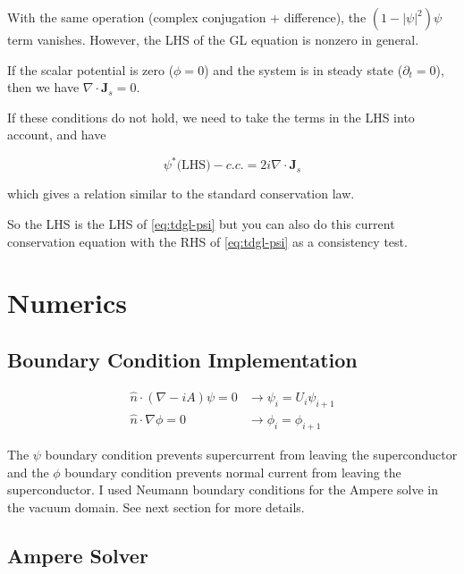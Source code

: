 \documentclass[11pt]{article}
\theoremstyle{definition}
\begin{document}
With the same operation (complex conjugation + difference), the $(1-|\psi|^2)\psi$ term vanishes. However, the LHS of the GL equation is nonzero in general.

If the scalar potential is zero ($\phi=0$) and the system is in steady state ($\partial_t = 0$), then we have $\nabla\cdot\mathbf{J}_s=0$.

If these conditions do not hold, we need to take the terms in the LHS into account, and have

\begin{equation}
\label{eq:cc-final}
\psi^* \text{(LHS)} - c.c. = 2i \nabla\cdot\mathbf{J}_s
\end{equation}

which gives a relation similar to the standard conservation law.

So the LHS is the LHS of \cref{eq:tdgl-psi} but you can also do this current conservation equation with the RHS of \cref{eq:tdgl-psi} as a consistency test.


\section{Numerics}
\label{sec:numerics}

\subsection{Boundary Condition Implementation}
\label{sec:bc-impl}

\begin{align}
\hat{n} \cdot (\nabla - i A) \psi = 0 &\rightarrow \psi_i = U_i \psi_{i+1} \label{eq:bc-impl-super}\\
\hat{n} \cdot \nabla \phi = 0 &\rightarrow \phi_i = \phi_{i+1} \label{eq:bc-impl-normal}
\end{align}

The $\psi$ boundary condition prevents supercurrent from leaving the superconductor and the $\phi$ boundary condition prevents normal current from leaving the superconductor.
I used Neumann boundary conditions for the Ampere solve in the vacuum domain. See next section for more details.

\subsection{Ampere Solver}
\label{sec:bc-ampere-solver}
\end{document}
